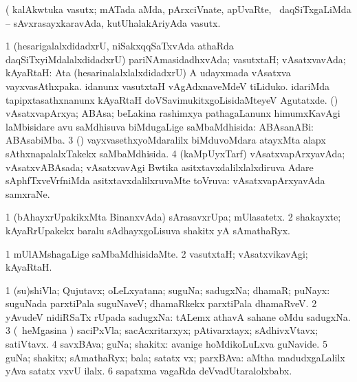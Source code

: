 \noindent 
\gl{\pagu}
\expl{}
\bmng
  (  kalAkwtuka vasutx; mATada aMda, pArxciVnate, apUvaRte, \mo\ daqSiTxgaLiMda -- sAvxrasayxkaravAda, kutUhalakAriyAda vasutx. 
\emng
\eentry

\bentry 
{} 
\gl{\gu}
\expl{}
\bmng
\bnum
\num{1} (hesarigalalxdidadxrU, niSakxqqSaTxvAda athaRda daqSiTxyiMdalalxdidadxrU) pariNAmasidadhxvAda; vasutxtaH; vAsatxvavAda; kAyaRtaH:  Ata (hesarinalalxlalxdidadxrU) A udayxmada vAsatxva vayxvasAthxpaka.  idanunx vasutxtaH vAgAdxnaveMdeV tiLiduko.  idariMda tapipxtasathxnanunx kAyaRtaH doVSavimukitxgoLisidaMteyeV Agutatxde. (\daqvi) vAsatxvapArxya; ABAsa; beLakina rashimxya pathagaLanunx himumxKavAgi laMbisidare avu saMdhisuva biMdugaLige saMbaMdhisida:  ABAsanABi:  ABAsabiMba. 
\num{3} (\yaMshA) vayxvasethxyoMdaralilx biMduvoMdara atayxMta alapx sAthxnapalalxTakekx saMbaMdhisida. 
\num{4} (kaMpUyxTarf) vAsatxvapArxyavAda; vAsatxvABAsada; vAsatxvavAgi Bwtika asitxtavxdalilxlalxdiruva Adare sAphfTxveVrfniMda asitxtavxdalilxruvaMte toVruva:  vAsatxvapArxyavAda samxraNe. 
\enum
\emng
\eentry

\bentry 
{} 
\gl{\nA}
\expl{}
\bmng
\bnum
\num{1} (bAhayxrUpakikxMta BinanxvAda) sArasavxrUpa; mUlasatetx. 
\num{2} shakayxte; kAyaRrUpakekx baralu sAdhayxgoLisuva shakitx yA sAmathaRyx. 
\enum
\emng
\eentry

\bentry 
{} 
\gl{\kirxvi}
\expl{}
\bmng
\bnum
\num{1} mUlAMshagaLige saMbaMdhisidaMte. 
\num{2} vasutxtaH; vAsatxvikavAgi; kAyaRtaH. 
\enum
\emng
\eentry

\bentry
{} 
\gl{\nA}
\expl{}
\bmng
\bnum
\num{1} (su)shiVla; Qujutavx; oLeLxyatana; suguNa; sadugxNa; dhamaR; puNayx:  suguNada parxtiPala suguNaveV; dhamaRkekx parxtiPala dhamaRveV. 
\num{2} yAvudeV nidiRSaTx rUpada sadugxNa:  tALemx athavA sahane oMdu sadugxNa. 
\num{3} (\kanmu\ heMgasina \vi) saciPxVla; sacAcxritarxyx; pAtivarxtayx; sAdhivxVtavx; satiVtavx. 
\num{4} savxBAva; guNa; shakitx:  avanige hoMdikoLuLxva guNavide. 
\num{5} guNa; shakitx; sAmathaRyx; bala; satatx vx; parxBAva:  aMtha madudxgaLalilx yAva satatx vxvU ilalx. 
\num{6} sapatxma vagaRda deVvadUtaralolxbabx. 
\enum
\emng

